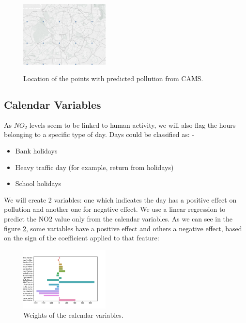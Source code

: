 \documentclass[a4paper,twocolumn,5p]{elsarticle}
\begin{document}
\begin{figure}
  \centering
  \includegraphics[width=0.4\textwidth]{camspoints}
  \label{figure:camspoints}
  \caption{Location of the points with predicted pollution from CAMS.}
\end{figure}

\subsection{Calendar Variables}
\label{sec:cal_data}

As $NO_2$ levels seem to be linked to human activity, we will also flag the hours 
belonging to a specific type of day. Days could be classified as:
-\begin{itemize}
  \item Bank holidays
  \item Heavy traffic day (for example, return from holidays)
  \item School holidays
\end{itemize} 

We will create 2 variables: one which indicates the day has a positive effect on pollution and 
another one for negative effect. We use a linear regression to predict the NO2 value only from the calendar variables.
As we can see in the figure \ref{figure:fourier}, some variables have a positive effect and others a negative effect, based on the
sign of the coefficient applied to that feature:

\begin{figure}
  \centering
  \includegraphics[width=0.4\textwidth]{calweights}
  \caption{Weights of the calendar variables.}
  \label{figure:fourier}
\end{figure}
\end{document}
